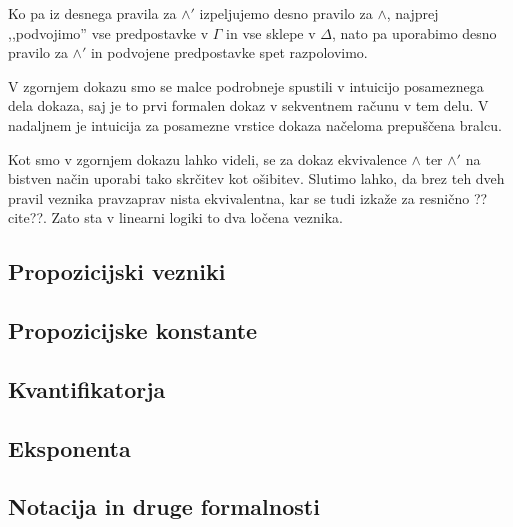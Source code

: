 \begin{dokaz}
    Ko pa iz desnega pravila za $\land'$ izpeljujemo desno pravilo za $\land$, najprej ,,podvojimo'' vse predpostavke v $\Gamma$ in vse sklepe v $\Delta$, nato pa uporabimo desno pravilo za $\land'$ in podvojene predpostavke spet razpolovimo.
    \begin{prooftree}
    \end{prooftree}
\end{dokaz}
\begin{opomba}
	V zgornjem dokazu smo se malce podrobneje spustili v intuicijo posameznega dela dokaza, saj je to prvi formalen dokaz v sekventnem računu v tem delu. V nadaljnem je intuicija za posamezne vrstice dokaza načeloma prepuščena bralcu.
\end{opomba}

Kot smo v zgornjem dokazu lahko videli, se za dokaz ekvivalence $\land$ ter $\land'$ na bistven način uporabi tako skrčitev kot ošibitev. Slutimo lahko, da brez teh dveh pravil veznika pravzaprav nista ekvivalentna, kar se tudi izkaže za resnično ??cite??. Zato sta v linearni logiki to dva ločena veznika.

\subsection{Propozicijski vezniki}


\subsection{Propozicijske konstante}


\subsection{Kvantifikatorja}


\subsection{Eksponenta}


\subsection{Notacija in druge formalnosti}

